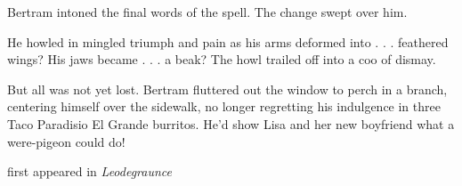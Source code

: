 Bertram intoned the final words of the spell. The change swept over him.

He howled in mingled triumph and pain as his arms deformed into . . .
feathered wings? His jaws became . . . a beak? The howl trailed off into
a coo of dismay.

But all was not yet lost. Bertram fluttered out the window to perch in a
branch, centering himself over the sidewalk, no longer regretting his
indulgence in three Taco Paradisio El Grande burritos. He'd show Lisa
and her new boyfriend what a were-pigeon could do!

first appeared in \emph{Leodegraunce}
